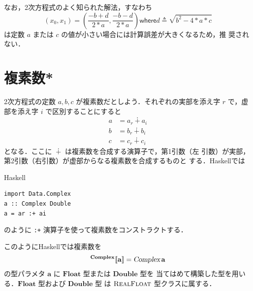 \documentclass[a5paper,twoside,fleqn,draft]{jsbook}
\def\[{[\![}
\def\]{]\!]}
\newcommand{\programminglanguage}[1]{\textsf{#1}}
\newcommand{\haskell}{\programminglanguage{Haskell}}
\newcommand{\code}[1]{\texttt{#1}}
\newenvironment{haskellcode}{\begin{itembox}[r]{\haskell}}{\end{itembox}}
\newcommand{\mKeyword}[1]{\mathsf{#1}}
\newcommand{\mWhereKeyword}{\mKeyword{where}}
\DeclareMathOperator{\mComplexPlus}{\dotplus}
\DeclareMathOperator{\mLetEq}{\triangleq}
\newcommand{\mType}[1]{\mathbf{#1}} %
\newcommand{\mA}{\mType{a}}
\newcommand{\mFloatType}{\mType{Float}}
\newcommand{\mDoubleType}{\mType{Double}}
\newcommand{\mTypeAssemble}[2]{{}^{\mType{#1}}\[\mType{#2}\]}
\newcommand{\mComplexType}[1]{\mTypeAssemble{Complex}{#1}}
\newcommand{\mTypeConstructor}[1]{\textsl{#1}}
\newcommand{\mTypeClass}[1]{\textsc{#1}} %
\newcommand{\mRealFloatTypeClass}{\mTypeClass{RealFloat}}
\newcommand{\mWhereIsEXP}[2]{\mathbin{\mWhereKeyword}#1\mLetEq#2} %
\begin{document}
なお，2次方程式のよく知られた解法，すなわち
\begin{equation}
  (x_0,x_1)=\left(\frac{-b+d}{2*a},\frac{-b-d}{2*a}\right)
  \mWhereIsEXP{d}{\sqrt{b^2-4*a*c}}
\end{equation}
は定数 $a$ または $c$ の値が小さい場合には計算誤差が大きくなるため，推
奨されない．

\section{複素数*}


2次方程式の定数 $a,b,c$ が複素数だとしよう．それぞれの実部を添え字 $r$
で，虚部を添え字 $i$ で区別することにすると
\begin{align}
a&=a_r\mComplexPlus a_i\\
b&=b_r\mComplexPlus b_i\\
c&=c_r\mComplexPlus c_i
\end{align}
となる．ここに $\mComplexPlus$ は複素数を合成する演算子で，第1引数（左
  引数）が実部，第2引数（右引数）が虚部からなる複素数を合成するものと
する．\haskell では
\begin{haskellcode}
\begin{verbatim}
import Data.Complex
a :: Complex Double
a = ar :+ ai
\end{verbatim}
\end{haskellcode}
のように \code{:+} 演算子を使って複素数をコンストラクトする．

このように\haskell では複素数を
\begin{equation}
  \mComplexType{a}=\mathop{\mTypeConstructor{Complex}}\mA
\end{equation}
の型パラメタ $\mA $ に $\mFloatType$ 型または $\mDoubleType$ 型を
当てはめて構築した型を用いる．$\mFloatType$ 型および $\mDoubleType$ 型
は $\mRealFloatTypeClass$ 型クラスに属する．
\end{document}
